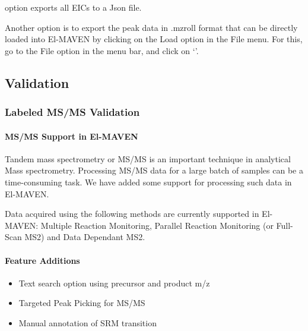 \documentclass[letterpaper,10pt,english,openany,oneside]{sphinxmanual}
\begin{document}
 option  exports all EICs to a Json file.

Another option is to export the peak data in .mzroll format that can be directly loaded into El-MAVEN by clicking on the Load  option in the File menu. For this, go to the File option in the menu bar, and click on ‘’.



\subsection{Validation}
\label{\detokenize{Documentation:validation}}

\subsubsection{Labeled MS/MS Validation}
\label{\detokenize{LabeledMSMSValidation:labeled-ms-ms-validation}}\label{\detokenize{LabeledMSMSValidation::doc}}

\paragraph{MS/MS Support in El-MAVEN}
\label{\detokenize{LabeledMSMSValidation:ms-ms-support-in-el-maven}}
Tandem mass spectrometry or MS/MS is an important technique in analytical Mass spectrometry. Processing MS/MS data for a large batch of samples can be a time-consuming task. We have added some support for processing such data in El-MAVEN.

Data acquired using the following methods are currently supported in El-MAVEN: Multiple Reaction Monitoring, Parallel Reaction Monitoring (or Full-Scan MS2) and Data Dependant MS2.


\paragraph{Feature Additions}
\label{\detokenize{LabeledMSMSValidation:feature-additions}}\begin{itemize}
\item {} 
Text search option using precursor and product m/z

\item {} 
Targeted Peak Picking for MS/MS

\item {} 
Manual annotation of SRM transition

\end{itemize}
\end{document}
